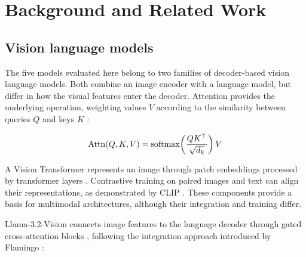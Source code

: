 \chapter{Background and Related Work}\label{ch:background}


\section{Vision language models}\label{sec:bg-vlm}

The five models evaluated here belong to two families of decoder-based
vision language models. Both combine an image encoder with a language model,
but differ in how the visual features enter the decoder. Attention provides
the underlying operation, weighting values $V$ according to the similarity
between queries $Q$ and keys $K$ \cite{vaswani2017attention}:

\begin{equation}
  \operatorname{Attn}(Q,K,V) = \operatorname{softmax}\!\left(\frac{QK^{\top}}{\sqrt{d_k}}\right)V
  \label{eq:attention}
\end{equation}

A Vision Transformer represents an image through patch embeddings processed
by transformer layers \cite{dosovitskiy2021vit}. Contrastive training on
paired images and text can align their representations, as demonstrated
by CLIP \cite{radford2021clip}. These components provide a basis for
multimodal architectures, although their integration and training differ.

Llama-3.2-Vision connects image features to the language decoder through
gated cross-attention blocks \cite{grattafiori2024llama3}, following the
integration approach introduced by Flamingo \cite{alayrac2022flamingo}:

